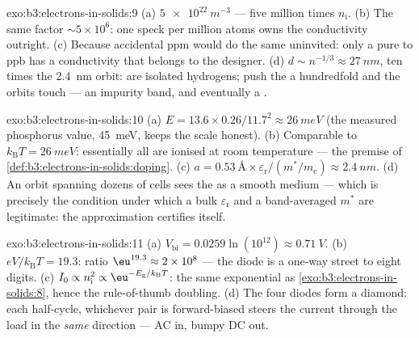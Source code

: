 \begin{solution}{exo:b3:electrons-in-solids:9}
(a) $\qty{5e22}{m^{-3}}$ --- five million times $n_{\text{i}}$.
(b) The same factor $\sim5\times10^6$: one speck per million
atoms owns the conductivity outright. (c) Because accidental ppm
would do the same uninvited: only a  pure to ppb has a
conductivity that belongs to the designer. (d) $d \sim n^{-1/3}
\approx \qty{27}{nm}$, ten times the \qty{2.4}{nm} orbit: 
are isolated hydrogens; push the  a hundredfold and the
orbits touch --- an impurity band, and eventually a .
\end{solution}

\begin{solution}{exo:b3:electrons-in-solids:10}
(a) $E = 13.6\times0.26/11.7^2 \approx \qty{26}{meV}$ (the
measured phosphorus value, \qty{45}{meV}, keeps the scale
honest). (b) Comparable to $k_{\text{B}}T = \qty{26}{meV}$:
essentially all  are ionised at room temperature --- the
premise of \cref{def:b3:electrons-in-solids:doping}. (c) $a =
\qty{0.53}{\angstrom}\times\varepsilon_{\text{r}}/(m^*/
m_{\text{e}}) \approx \qty{2.4}{nm}$. (d) An orbit spanning
dozens of cells sees the  as a smooth medium --- which is
precisely the condition under which a bulk
$\varepsilon_{\text{r}}$ and a band-averaged $m^*$ are legitimate:
the approximation certifies itself.
\end{solution}

\begin{solution}{exo:b3:electrons-in-solids:11}
(a) $V_{\text{bi}} = 0.0259\ln(10^{12}) \approx \qty{0.71}{V}$.
(b) $eV/k_{\text{B}}T = 19.3$: ratio $\eu^{19.3} \approx
2\times10^{8}$ --- the diode is a one-way street to eight
digits. (c) $I_0 \propto n_{\text{i}}^2 \propto
\eu^{-E_{\text{g}}/k_{\text{B}}T}$: the same exponential as
\cref{exo:b3:electrons-in-solids:8}, hence the
rule-of-thumb doubling. (d) The four diodes form a diamond: each
half-cycle, whichever pair is forward-biased steers the current
through the load in the \emph{same} direction --- AC in, bumpy
DC out.
\end{solution}

